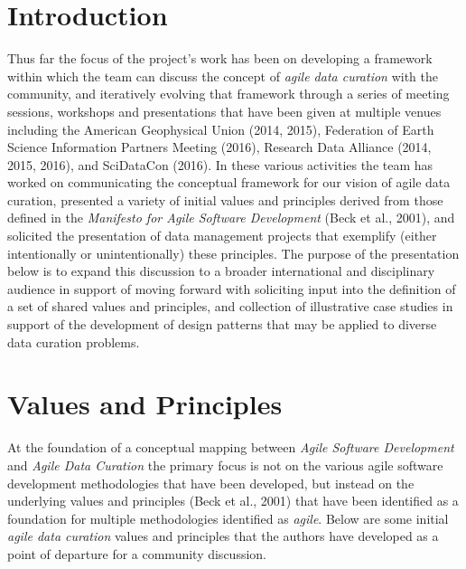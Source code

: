 \documentclass[final]{beamer}
\begin{document}
\begin{frame}[t]
\begin{multicols}{2}





\section{Introduction}\label{introduction}

Thus far the focus of the project's work has been on developing a
framework within which the team can discuss the concept of \emph{agile
data curation} with the community, and iteratively evolving that
framework through a series of meeting sessions, workshops and
presentations that have been given at multiple venues including the
American Geophysical Union (2014, 2015), Federation of Earth Science
Information Partners Meeting (2016), Research Data Alliance (2014, 2015,
2016), and SciDataCon (2016). In these various activities the team has
worked on communicating the conceptual framework for our vision of agile
data curation, presented a variety of initial values and principles
derived from those defined in the \emph{Manifesto for Agile Software
Development} (Beck et al., 2001), and solicited the presentation of data
management projects that exemplify (either intentionally or
unintentionally) these principles. The purpose of the presentation below
is to expand this discussion to a broader international and disciplinary
audience in support of moving forward with soliciting input into the
definition of a set of shared values and principles, and collection of
illustrative case studies in support of the development of design
patterns that may be applied to diverse data curation problems.

\section{Values and Principles}\label{values-and-principles}

At the foundation of a conceptual mapping between \emph{Agile Software
Development} and \emph{Agile Data Curation} the primary focus is not on
the various agile software development methodologies that have been
developed, but instead on the underlying values and principles (Beck et
al., 2001) that have been identified as a foundation for multiple
methodologies identified as \emph{agile}. Below are some initial
\emph{agile data curation} values and principles that the authors have
developed as a point of departure for a community discussion.


\end{multicols}
\end{frame}
\end{document}
